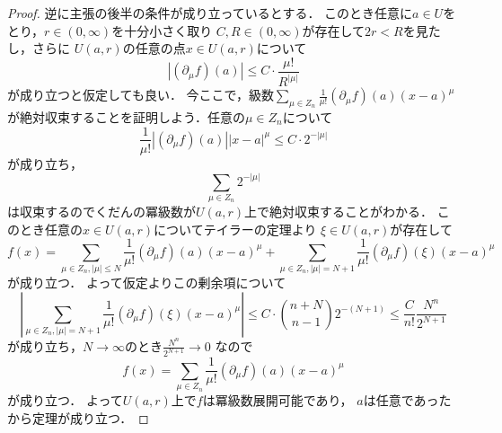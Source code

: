 \documentclass[leqno, a4paper, 12pt]{jsarticle}
\begin{document}
\begin{proof}
逆に主張の後半の条件が成り立っているとする．
このとき任意に$a\in U$をとり，$r\in (0, \infty)$を十分小さく取り
$C, R\in (0, \infty)$が存在して$2r<R$を見たし，さらに
$U(a, r)$の任意の点$x\in U(a, r)$について
\[
|(\partial_{\mu}f)(a)|\le C\cdot\frac{\mu!}{R^{|\mu|}}
\]
が成り立つと仮定しても良い．
今ここで，級数$\sum_{\mu\in Z_n}\frac{1}{\mu!}(\partial_{\mu}f)(a)(x-a)^{\mu}$
が絶対収束することを証明しよう．任意の$\mu\in Z_n$について
\[
\frac{1}{\mu!}|(\partial_{\mu}f)(a)||x-a|^{\mu}\le 
C\cdot 2^{-|\mu|}
\]
が成り立ち，
\[
\sum_{\mu\in Z_n}2^{-|\mu|}
\]
は収束するのでくだんの冪級数が$U(a, r)$上で絶対収束することがわかる．
このとき任意の$x\in U(a, r)$についてテイラーの定理より
$\xi\in U(a, r)$が存在して
\[
f(x)=\sum_{\mu\in Z_n, |\mu|\le N}\frac{1}{\mu!}(\partial_{\mu}f)(a)(x-a)^{\mu}
+\sum_{\mu\in Z_n, |\mu|=N+1}\frac{1}{\mu!}(\partial_{\mu}f)(\xi)(x-a)^{\mu}
\]
が成り立つ．
よって仮定よりこの剰余項について
\[
\left|\sum_{\mu\in Z_n, |\mu|=N+1}\frac{1}{\mu!}(\partial_{\mu}f)(\xi)(x-a)^{\mu}\right|
\le C\cdot \binom{n+N}{n-1}2^{-(N+1)}\le 
\frac{C}{n!}\frac{N^n}{2^{N+1}} 
\]
が成り立ち，$N\to \infty$のとき$\frac{N^n}{2^{N+1}}\to 0$
なので
\[
f(x)=\sum_{\mu\in Z_n}\frac{1}{\mu!}(\partial_{\mu}f)(a)(x-a)^{\mu}
\]
が成り立つ．
よって$U(a, r)$上で$f$は冪級数展開可能であり，
 $a$は任意であったから定理が成り立つ．
\end{proof}
\end{document}
